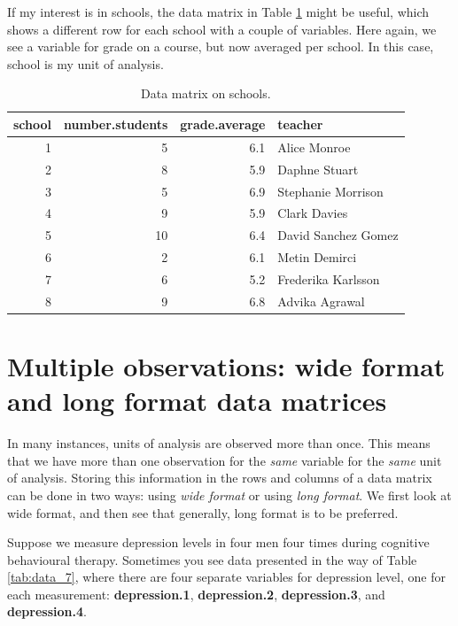 \documentclass[]{report}\usepackage[]{graphicx}\usepackage[]{color}
\begin{document}
If my interest is in schools, the data matrix in Table \ref{tab:data_3} might be useful, which shows a different row for each school with a couple of variables. Here again, we see a variable for grade on a course, but now averaged per school. In this case, school is my unit of analysis.

\begin{table}[ht]
\centering
\caption{Data matrix on schools.} 
\label{tab:data_3}
\begin{tabular}{rrrl}
  \hline
school & number.students & grade.average & teacher \\ 
  \hline
1 & 5 & 6.1 & Alice Monroe \\ 
  2 & 8 & 5.9 & Daphne Stuart \\ 
  3 & 5 & 6.9 & Stephanie Morrison \\ 
  4 & 9 & 5.9 & Clark Davies \\ 
  5 & 10 & 6.4 & David Sanchez Gomez \\ 
  6 & 2 & 6.1 & Metin Demirci \\ 
  7 & 6 & 5.2 & Frederika Karlsson \\ 
  8 & 9 & 6.8 & Advika Agrawal \\ 
   \hline
\end{tabular}
\end{table}



\section{Multiple observations: wide format and long format data matrices}

In many instances, units of analysis are observed more than once. This means that we have more than one observation for the \textit{same} variable for the \textit{same} unit of analysis. Storing this information in the rows and columns of a data matrix can be done in two ways: using \textit{wide format} or using \textit{long format}. We first look at wide format, and then see that generally, long format is to be preferred.

Suppose we measure depression levels in four men four times during cognitive behavioural therapy. Sometimes you see data presented in the way of Table \ref{tab:data_7}, where there are four separate variables for depression level, one for each measurement: \textbf{depression.1}, \textbf{depression.2}, \textbf{depression.3}, and \textbf{depression.4}.
\end{document}
